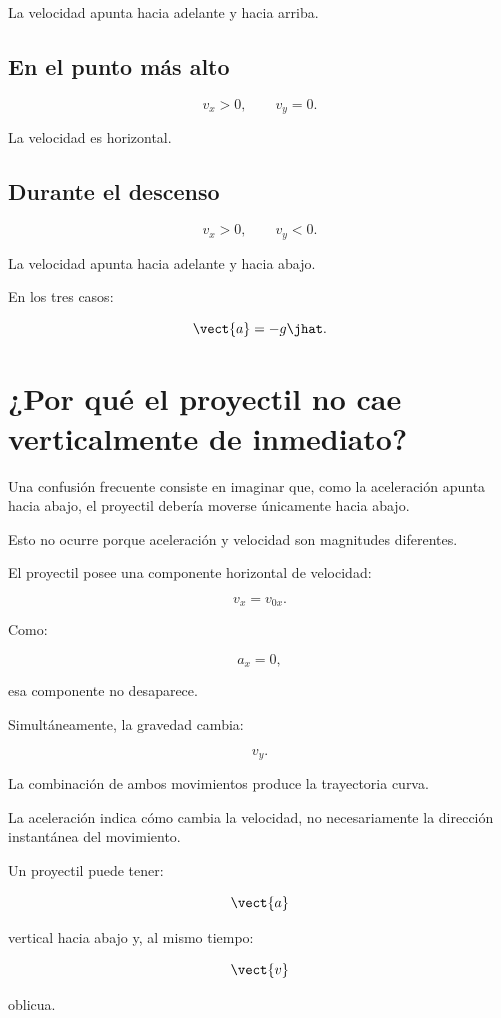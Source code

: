 La velocidad apunta hacia adelante y hacia arriba.


\subsection{En el punto más alto}

\[
v_x>0,
\qquad
v_y=0.
\]

La velocidad es horizontal.


\subsection{Durante el descenso}

\[
v_x>0,
\qquad
v_y<0.
\]

La velocidad apunta hacia adelante y hacia abajo.

En los tres casos:

\[
\vect{a}=-g\jhat.
\]


\section{¿Por qué el proyectil no cae verticalmente de inmediato?}

Una confusión frecuente consiste en imaginar que, como la aceleración apunta
hacia abajo, el proyectil debería moverse únicamente hacia abajo.

Esto no ocurre porque aceleración y velocidad son magnitudes diferentes.

El proyectil posee una componente horizontal de velocidad:

\[
v_x=v_{0x}.
\]

Como:

\[
a_x=0,
\]

esa componente no desaparece.

Simultáneamente, la gravedad cambia:

\[
v_y.
\]

La combinación de ambos movimientos produce la trayectoria curva.

\begin{idea}
La aceleración indica cómo cambia la velocidad, no necesariamente la dirección
instantánea del movimiento.

Un proyectil puede tener:

\[
\vect{a}
\]

vertical hacia abajo y, al mismo tiempo:

\[
\vect{v}
\]

oblicua.
\end{idea}


